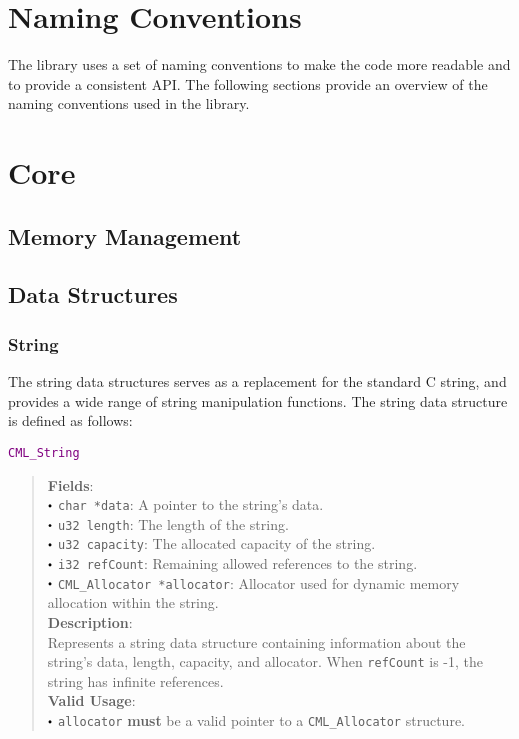 \documentclass[a4paper,oneside,10pt]{article}
\newcommand{\struct}[1]{
  \noindent\textcolor{purple}{\texttt{#1}}
  \vspace{-0.3em}
}
\renewcommand{\dot}{\raisebox{0.3ex}{\scalebox{0.6}{$\bullet$}}}
\theoremstyle{definition}
\begin{document}
\section{Naming Conventions} \label{sec:naming_conventions}

The library uses a set of naming conventions to make the code more readable and to provide a consistent API. The following sections provide an overview of the naming conventions used in the library.

\section{Core} \label{sec:core}

\subsection{Memory Management}

\subsection{Data Structures}

\subsubsection{String}

The string data structures serves as a replacement for the standard C string, and provides a wide range of string manipulation functions. The string data structure is defined as follows: \newline

\struct{CML\_String}
\begin{quote}
  \textbf{Fields}: \\
  $\dot$ \texttt{char *data}: A pointer to the string's data. \\
  $\dot$ \texttt{u32 length}: The length of the string. \\
  $\dot$ \texttt{u32 capacity}: The allocated capacity of the string. \\
  $\dot$ \texttt{i32 refCount}: Remaining allowed references to the string. \\
  $\dot$ \texttt{CML\_Allocator *allocator}: Allocator used for dynamic memory allocation within the string. \\
  
  \vspace{-0.75em}
  \textbf{Description}: \\
  Represents a string data structure containing information about the string's data, length, capacity, and allocator. When \texttt{refCount} is -1, the string has infinite references. \\

  \vspace{-0.75em}
  \textbf{Valid Usage}: \\
  $\dot$ \texttt{allocator} \textbf{must} be a valid pointer to a \texttt{CML\_Allocator} structure. \\
\end{quote}
\end{document}
